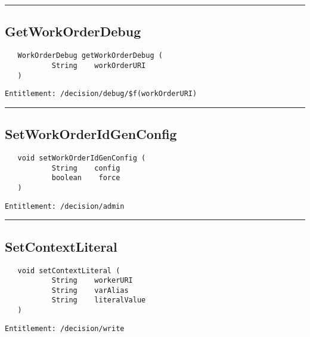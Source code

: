 \rule{12cm}{2pt}
\subsection{GetWorkOrderDebug}
\label{Api:GetWorkOrderDebug}
\begin{verbatim}
   WorkOrderDebug getWorkOrderDebug (
           String    workOrderURI
   )
\end{verbatim}
\begin{Verbatim}[fontsize=\small, formatcom=\color{Maroon}]
  Entitlement: /decision/debug/$f(workOrderURI)
\end{Verbatim}



\rule{12cm}{2pt}
\subsection{SetWorkOrderIdGenConfig}
\label{Api:SetWorkOrderIdGenConfig}
\begin{verbatim}
   void setWorkOrderIdGenConfig (
           String    config
           boolean    force
   )
\end{verbatim}
\begin{Verbatim}[fontsize=\small, formatcom=\color{Maroon}]
  Entitlement: /decision/admin
\end{Verbatim}



\rule{12cm}{2pt}
\subsection{SetContextLiteral}
\label{Api:SetContextLiteral}
\begin{verbatim}
   void setContextLiteral (
           String    workerURI
           String    varAlias
           String    literalValue
   )
\end{verbatim}
\begin{Verbatim}[fontsize=\small, formatcom=\color{Maroon}]
  Entitlement: /decision/write
\end{Verbatim}



